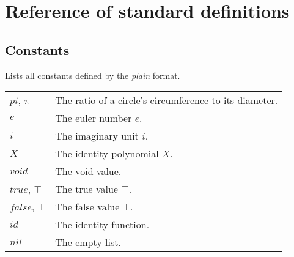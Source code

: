 \documentclass[10pt]{article}
\begin{document}
    \section{Reference of standard definitions}\label{sec:reference-def}

    \subsection{Constants}
    Lists all constants defined by the \textit{plain} format.
    \begin{longtable}{p{}p{}}
        $ pi $, $ \pi $     & The ratio of a circle's circumference to its diameter. \\
        $ e $               & The euler number $ e $. \\
        $ i $               & The imaginary unit $ i $. \\
        $ X $               & The identity polynomial $ X $. \\
        $ void $            & The void value. \\
        $ true $, $ \top $  & The true value $ \top $. \\
        $ false $, $ \bot $ & The false value $ \bot $. \\
        $ id $              & The identity function. \\
        $ nil $             & The empty list. \\
    \end{longtable}
    
\end{document}
